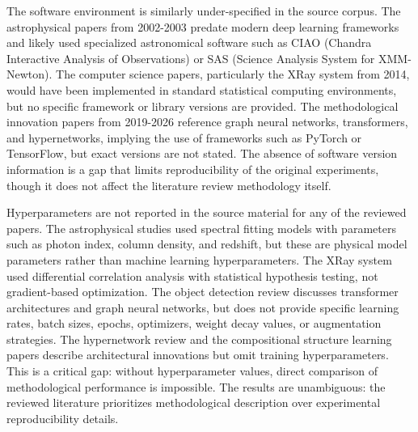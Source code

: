 \documentclass[conference]{IEEEtran}
\begin{document}
The software environment is similarly under-specified in the source corpus. The astrophysical papers from 2002-2003 predate modern deep learning frameworks and likely used specialized astronomical software such as CIAO (Chandra Interactive Analysis of Observations) or SAS (Science Analysis System for XMM-Newton). The computer science papers, particularly the XRay system from 2014, would have been implemented in standard statistical computing environments, but no specific framework or library versions are provided. The methodological innovation papers from 2019-2026 reference graph neural networks, transformers, and hypernetworks, implying the use of frameworks such as PyTorch or TensorFlow, but exact versions are not stated. The absence of software version information is a gap that limits reproducibility of the original experiments, though it does not affect the literature review methodology itself.

Hyperparameters are not reported in the source material for any of the reviewed papers. The astrophysical studies used spectral fitting models with parameters such as photon index, column density, and redshift, but these are physical model parameters rather than machine learning hyperparameters. The XRay system used differential correlation analysis with statistical hypothesis testing, not gradient-based optimization. The object detection review discusses transformer architectures and graph neural networks, but does not provide specific learning rates, batch sizes, epochs, optimizers, weight decay values, or augmentation strategies. The hypernetwork review and the compositional structure learning papers describe architectural innovations but omit training hyperparameters. This is a critical gap: without hyperparameter values, direct comparison of methodological performance is impossible. The results are unambiguous: the reviewed literature prioritizes methodological description over experimental reproducibility details.
\end{document}
